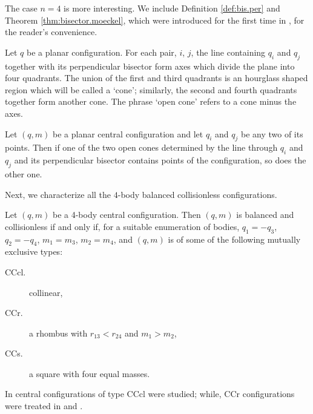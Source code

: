 \documentclass[smallcondensed]{svjour3}
\begin{document}
The case $n=4$ is more interesting. We include Definition \ref{def:bis.per} and Theorem \ref{thm:bisector.moeckel}, which were introduced  for the first time in  \cite{moeckel1990central}, for the reader's convenience.

\begin{definition}\label{def:bis.per}
Let $q$ be a planar configuration. For each pair, $i$, $j$, the line
containing $q_i$ and $q_j$ together with its perpendicular bisector form axes which
divide the plane into four quadrants. The union of the first and third quadrants
is an hourglass shaped region which will be called a `cone'; similarly,
the second and fourth quadrants together form another cone. The phrase `open
cone' refers to a cone minus the axes.
\end{definition}

\begin{theorem}\label{thm:bisector.moeckel}
Let $(q,m)$ be a planar central configuration and let
$q_i$ and $q_j$ be any two of its points. Then if one of the two open cones determined
by the line through $q_i$ and $q_j$ and its perpendicular bisector contains points of
the configuration, so does the other one.
\end{theorem}

Next, we characterize all the $4$-body balanced collisionless configurations.

\begin{theorem}\label{thm:caracterizacion4}
Let $(q,m)$ be a 4-body central configuration. Then $(q,m)$ is  balanced and collisionless if and only if,  for a suitable enumeration  of bodies,   $q_1=-q_3$, $q_2=-q_4$, $m_1=m_3$,  $m_2=m_4$, and  $(q,m)$ is of some of the following mutually exclusive types:
\begin{description}
\item[CCcl.]   collinear,
\item[CCr.]  a rhombus with $r_{13}<r_{24}$ and $m_1>m_2$,
\item[CCs.]  a square with four equal masses.
\end{description}
\end{theorem}




\begin{remark} In \cite{shoaib2011collinear}  central configurations of type CCcl were studied; while,  CCr configurations were treated in \cite{long2002four} and \cite{perez2007convex}.

\end{remark}
\end{document}

